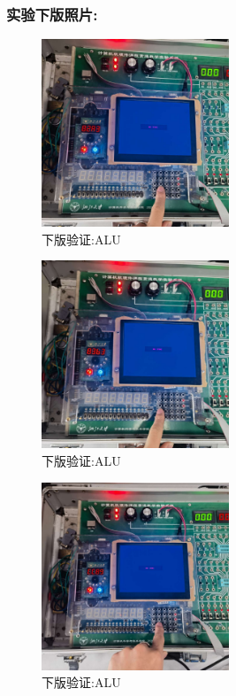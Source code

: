 \documentclass{article}
\begin{document}
\subsubsection*{实验下版照片:}

    \begin{figure}[H]
    \centering
    \includegraphics[width=0.5\textwidth]{11.jpg}
    \caption{\label{Lab11}下版验证:ALU}
    \end{figure}

    \begin{figure}[H]
    \centering
    \includegraphics[width=0.5\textwidth]{10.jpg}
    \caption{\label{Lab11}下版验证:ALU}
    \end{figure}

    \begin{figure}[H]
        \centering
        \includegraphics[width=0.5\textwidth]{12.jpg}
        \caption{\label{Lab11}下版验证:ALU}
        \end{figure}
\end{document}
